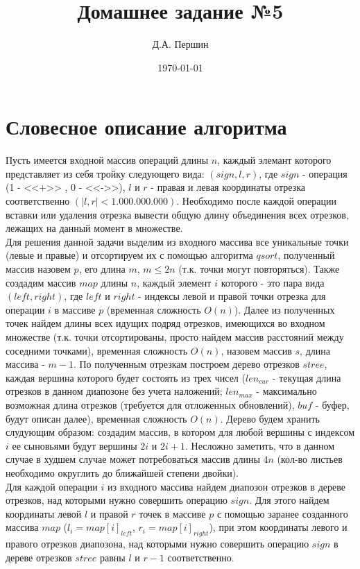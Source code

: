 \documentclass[12pt]{article}
\title{\bf Домашнее задание №5}
\author{Д.А. Першин}
\date{\today}
\begin{document}
\maketitle


\section{Словесное описание алгоритма}

Пусть имеется входной массив операций длины $n$, каждый элемант которого представляет из себя тройку следующего вида: $(sign,l,r)$, где $sign$ - операция (1 - <<+>> , 0 - <<->>), $l$ и $r$ - правая и левая координаты  отрезка соответственно $(|l,r|< 1.000.000.000)$. Необходимо после каждой операции вставки или удаления отрезка вывести общую длину объединения всех отрезков, лежащих на данный момент в множестве.\\

Для решения данной задачи выделим из входного массива все уникальные точки (левые и правые) и отсортируем их с помощью алгоритма $qsort$, полученный массив назовем $p$, его длина $m$, $m \leq 2n$ (т.к. точки могут повторяться). Также создадим массив $map$ длины $n$, каждый элемент $i$ которого - это пара вида $(left,right)$, где $left$ и $right$ - индексы левой и правой точки отрезка для операции $i$ в массиве $p$ (временная сложность $O(n)$). Далее из полученных точек найдем длины всех идущих подряд отрезков, имеющихся во входном множестве (т.к. точки отсортированы, просто найдем массив расстояний между соседними точками), временная сложность $O(n)$, назовем массив $s$, длина массива - $m-1$. По полученным отрезкам построем дерево отрезков $stree$, каждая вершина которого будет состоять из трех чисел ($len_{cur}$ - текущая длина отрезков в данном диапозоне без учета наложений; $len_{max}$ - максимально возможная длина отрезков (требуется для отложенных обновлений), $buf$ - буфер, будут описан далее), временная сложность $O(n)$. Дерево будем хранить слудующим образом: создадим массив, в котором для любой вершины с индексом $i$ ее сыновьями будут вершины $2i$ и $2i+1$. Несложно заметить, что в данном случае в худшем случае может потребоваться массив длины $4n$ (кол-во листьев необходимо округлить до ближайшей степени двойки).\\

Для каждой операции $i$ из входного массива найдем диапозон отрезков в дереве отрезков, над которыми нужно совершить операцию $sign$. Для этого найдем координаты левой $l$ и правой $r$ точек в массиве $p$ с помощью заранее созданного массива  $map$ ($l_i =  map[i]_{left}$, $r_i = map[i]_{right}$), при этом координаты левого и правого отрезков диапозона, над которыми нужно совершить операцию $sign$ в дереве отрезков $stree$ равны  $l$ и $r-1$ соответственно.\\
\end{document}
